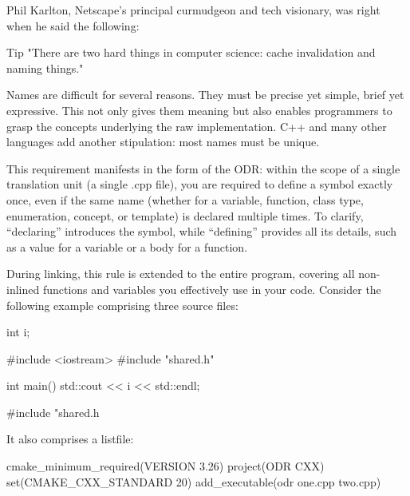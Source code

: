 
Phil Karlton, Netscape’s principal curmudgeon and tech visionary, was right when he said the following:

\begin{myTip}{Tip}
"There are two hard things in computer science: cache invalidation and naming
things."
\end{myTip}

Names are difficult for several reasons. They must be precise yet simple, brief yet expressive. This not only gives them meaning but also enables programmers to grasp the concepts underlying the raw implementation. C++ and many other languages add another stipulation: most names must be unique.

This requirement manifests in the form of the ODR: within the scope of a single translation unit (a single .cpp file), you are required to define a symbol exactly once, even if the same name (whether for a variable, function, class type, enumeration, concept, or template) is declared multiple times. To clarify, “declaring” introduces the symbol, while “defining” provides all its details, such as a value for a variable or a body for a function.

During linking, this rule is extended to the entire program, covering all non-inlined functions and variables you effectively use in your code. Consider the following example comprising three source files:


\begin{cpp}
int i;
\end{cpp}


\begin{cpp}
#include <iostream>
#include "shared.h"

int main() {
    std::cout << i << std::endl;
}
\end{cpp}


\begin{cpp}
#include "shared.h
\end{cpp}

It also comprises a listfile:


\begin{cmake}
cmake_minimum_required(VERSION 3.26)
project(ODR CXX)
set(CMAKE_CXX_STANDARD 20)
add_executable(odr one.cpp two.cpp)
\end{cmake}

